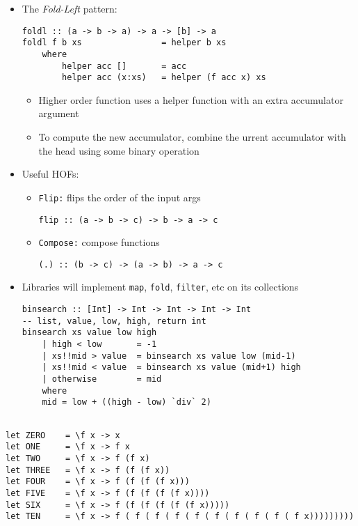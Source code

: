 \documentclass[landscape,8pt]{extarticle}
\newcommand{\code}{\lstinline}
\begin{document}
\begin{multicols}{4}
\begin{itemize}
\begin{itemize}
                \item \code{cat = foldr (\x n -> x ++ n) ""}
            \end{itemize}
            \item The \emph{Fold-Left} pattern:
            \begin{lstlisting}
foldl :: (a -> b -> a) -> a -> [b] -> a
foldl f b xs                = helper b xs
    where
        helper acc []       = acc
        helper acc (x:xs)   = helper (f acc x) xs
            \end{lstlisting}
            \begin{itemize}
                \item Higher order function uses a helper function with an extra accumulator argument
                \item To compute the new accumulator, combine the urrent accumulator with the head using some binary operation
            \end{itemize}
            \item Useful HOFs:
            \begin{itemize}
                \item \code{Flip:} flips the order of the input args
                \begin{lstlisting}
flip :: (a -> b -> c) -> b -> a -> c
                \end{lstlisting}
                \item \code{Compose:} compose functions
                \begin{lstlisting}
(.) :: (b -> c) -> (a -> b) -> a -> c
                \end{lstlisting}
            \end{itemize}
            \item Libraries will implement \code{map}, \code{fold}, \code{filter}, etc on its collections
                \begin{lstlisting}
binsearch :: [Int] -> Int -> Int -> Int -> Int 
-- list, value, low, high, return int
binsearch xs value low high
    | high < low       = -1
    | xs!!mid > value  = binsearch xs value low (mid-1)
    | xs!!mid < value  = binsearch xs value (mid+1) high
    | otherwise        = mid
    where
    mid = low + ((high - low) `div` 2)
    
\end{lstlisting}


    \end{itemize}
    \pagebreak
    \begin{center}
        \begin{adjustbox}{angle=270}
            \begin{lstlisting}
let ZERO    = \f x -> x
let ONE     = \f x -> f x
let TWO     = \f x -> f (f x)
let THREE   = \f x -> f (f (f x))
let FOUR    = \f x -> f (f (f (f x)))
let FIVE    = \f x -> f (f (f (f (f x))))
let SIX     = \f x -> f (f (f (f (f (f x)))))
let TEN     = \f x -> f ( f ( f ( f ( f ( f ( f ( f ( f ( f x)))))))))


\end{lstlisting}
\end{adjustbox}
\end{center}
\end{multicols}
\end{document}
